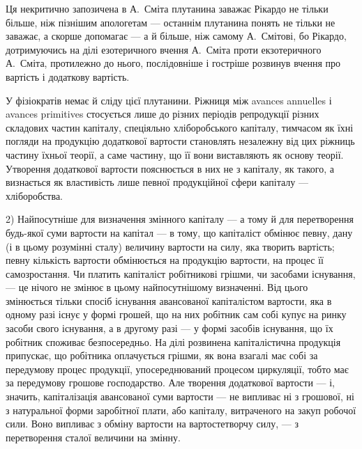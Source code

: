 
Ця некритично запозичена в А.~Сміта плутанина заважає Рікардо
не тільки більше, ніж пізнішим апологетам — останнім плутанина понять
не тільки не заважає, а скорше допомагає — а й більше, ніж самому
А.~Смітові, бо Рікардо, дотримуючись на ділі езотеричного вчення
А.~Сміта проти екзотеричного А.~Сміта, протилежно до нього, послідовніше
і гостріше розвинув вчення про вартість і додаткову вартість.

У фізіократів немає й сліду цієї плутанини. Ріжниця між avances
annuelles і avances primitives стосується лише до різних періодів репродукції
різних складових частин капіталу, спеціяльно хліборобського капіталу,
тимчасом як їхні погляди на продукцію додаткової вартости становлять
незалежну від цих ріжниць частину їхньої теорії, а саме частину,
що її вони виставляють як основу теорії. Утворення додаткової вартости
пояснюється в них не з капіталу, як такого, а визнається як властивість
лише певної продукційної сфери капіталу — хліборобства.

2) Найпосутніше для визначення змінного капіталу — а тому й для
перетворення будь-якої суми вартости на капітал — в тому, що капіталіст
обмінює певну, дану (і в цьому розумінні сталу) величину вартости на
силу, яка творить вартість; певну кількість вартости обмінюється на продукцію
вартости, на процес її самозростання. Чи платить капіталіст робітникові
грішми, чи засобами існування, — це нічого не змінює в цьому
найпосутнішому визначенні. Від цього змінюється тільки спосіб існування
авансованої капіталістом вартости, яка в одному разі існує у формі грошей,
що на них робітник сам собі купує на ринку засоби свого існування,
а в другому разі — у формі засобів існування, що їх робітник
споживає безпосередньо. На ділі розвинена капіталістична продукція
припускає, що робітника оплачується грішми, як вона взагалі має собі
за передумову процес продукції, упосереднюваний процесом циркуляції,
тобто має за передумову грошове господарство. Але творення додаткової
вартости — і, значить, капіталізація авансованої суми вартости — не випливає
ні з грошової, ні з натуральної форми заробітної плати, або капіталу,
витраченого на закуп робочої сили. Воно випливає з обміну вартости
на вартостетворчу силу, — з перетворення сталої величини на змінну.

